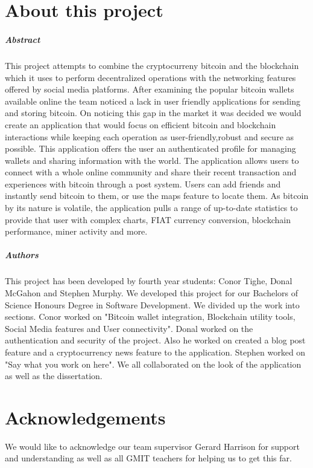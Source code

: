 
\chapter*{About this project}
\paragraph{Abstract}
This project attempts to combine the cryptocurreny bitcoin and the blockchain which it uses to perform decentralized operations with the networking features offered by social media platforms. After examining the popular bitcoin wallets available online the team noticed a lack in user friendly applications for sending and storing bitcoin. On noticing this gap in the market it was decided we would create an application that would focus on efficient bitcoin and blockchain interactions while keeping each operation as user-friendly,robust and secure as possible. This application offers the user an authenticated profile for managing wallets and sharing information with the world. The application allows users to connect with a whole online community and share their recent transaction and experiences with bitcoin through a post system. Users can add friends and instantly send bitcoin to them, or use the maps feature to locate them. As bitcoin by its nature is volatile, the application pulls a range of up-to-date statistics to provide that user with complex charts, FIAT currency conversion, blockchain performance, miner activity and more.

\paragraph{Authors}
This project has been developed by fourth year students: Conor Tighe, Donal McGahon and Stephen Murphy. We developed this project for our Bachelors of Science Honours Degree in Software Development. We divided up the work into sections. Conor worked on "Bitcoin wallet integration, Blockchain utility tools, Social Media features and User connectivity". Donal worked on the authentication and security of the project. Also he worked on created a blog post feature and a cryptocurrency news feature to the application. Stephen worked on "Say what you work on here". We all collaborated on the look of the application as well as the dissertation.

\chapter*{Acknowledgements}
We would like to acknowledge our team supervisor Gerard Harrison for support and understanding as well as all GMIT teachers for helping us to get this far.


